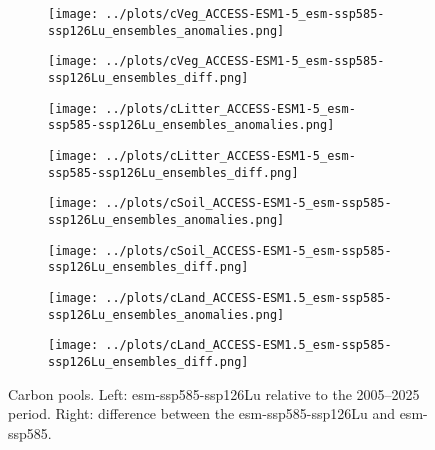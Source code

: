 \documentclass[]{article}
\begin{document}
\begin{figure}[H]
    \centering
    \begin{subfigure}[b]{0.4\linewidth}
        \texttt{[image: ../plots/cVeg\_ACCESS-ESM1-5\_esm-ssp585-ssp126Lu\_ensembles\_anomalies.png]}
    \end{subfigure}
    \begin{subfigure}[b]{0.4\linewidth}
        \texttt{[image: ../plots/cVeg\_ACCESS-ESM1-5\_esm-ssp585-ssp126Lu\_ensembles\_diff.png]}
    \end{subfigure}
    \begin{subfigure}[b]{0.4\linewidth}
        \texttt{[image: ../plots/cLitter\_ACCESS-ESM1-5\_esm-ssp585-ssp126Lu\_ensembles\_anomalies.png]}
    \end{subfigure}
    \begin{subfigure}[b]{0.4\linewidth}
        \texttt{[image: ../plots/cLitter\_ACCESS-ESM1-5\_esm-ssp585-ssp126Lu\_ensembles\_diff.png]}
    \end{subfigure}
    \begin{subfigure}[b]{0.4\linewidth}
        \texttt{[image: ../plots/cSoil\_ACCESS-ESM1-5\_esm-ssp585-ssp126Lu\_ensembles\_anomalies.png]}
    \end{subfigure}
    \begin{subfigure}[b]{0.4\linewidth}
        \texttt{[image: ../plots/cSoil\_ACCESS-ESM1-5\_esm-ssp585-ssp126Lu\_ensembles\_diff.png]}
    \end{subfigure}
\begin{subfigure}[b]{0.4\linewidth}
        \texttt{[image: ../plots/cLand\_ACCESS-ESM1.5\_esm-ssp585-ssp126Lu\_ensembles\_anomalies.png]}
    \end{subfigure}
    \begin{subfigure}[b]{0.4\linewidth}
        \texttt{[image: ../plots/cLand\_ACCESS-ESM1.5\_esm-ssp585-ssp126Lu\_ensembles\_diff.png]}
    \end{subfigure}
    \caption{Carbon pools. Left: esm-ssp585-ssp126Lu relative to the 2005–2025 period. Right: difference between the esm-ssp585-ssp126Lu and esm-ssp585.}
    \label{fig:cpools}
\end{figure}
\end{document}
